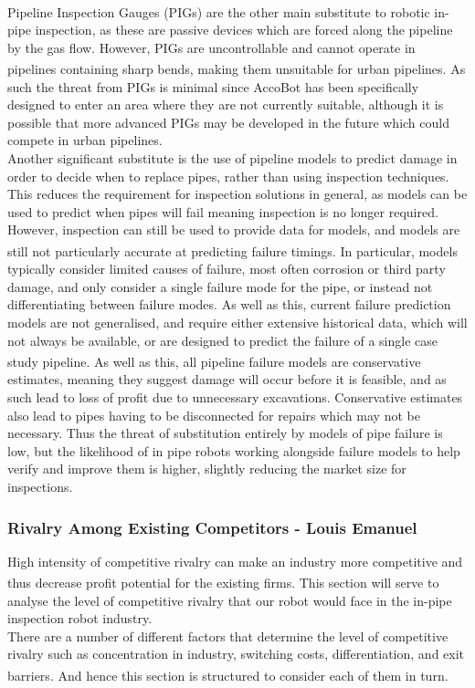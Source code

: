 \documentclass[11pt]{article}		%
\newcommand{\supercite}[1]{\textsuperscript{\cite{#1}}}		%
\begin{document}
				\\
				Pipeline Inspection Gauges (PIGs) are the other main substitute to robotic in-pipe inspection, as these are passive devices which are forced along the pipeline by the gas flow.
				However, PIGs are uncontrollable and cannot operate in pipelines containing sharp bends\supercite{mills2017advances}, making them unsuitable for urban pipelines.
				As such the threat from PIGs is minimal since AccoBot has been specifically designed to enter an area where they are not currently suitable, although it is possible that more advanced PIGs may be developed in the future which could compete in urban pipelines.
				\\
				Another significant substitute is the use of pipeline models to predict damage in order to decide when to replace pipes, rather than using inspection techniques.
				This reduces the requirement for inspection solutions in general, as models can be used to predict when pipes will fail meaning inspection is no longer required.
				However, inspection can still be used to provide data for models, and models are still not particularly accurate at predicting failure timings\supercite{zakikhani2020review}.
				In particular, models typically consider limited causes of failure, most often corrosion or third party damage, and only consider a single failure mode for the pipe, or instead not differentiating between failure modes.
				As well as this, current failure prediction models are not generalised, and require either extensive historical data, which will not always be available, or are designed to predict the failure of a single case study pipeline\supercite{zakikhani2020review}.
				As well as this, all pipeline failure models are conservative estimates, meaning they suggest damage will occur before it is feasible, and as such lead to loss of profit due to unnecessary excavations.
				Conservative estimates also lead to pipes having to be disconnected for repairs which may not be necessary.
				Thus the threat of substitution entirely by models of pipe failure is low, but the likelihood of in pipe robots working alongside failure models to help verify and improve them is higher, slightly reducing the market size for inspections.
			
			\subsubsection{Rivalry Among Existing Competitors - Louis Emanuel}
				High intensity of competitive rivalry can make an industry more competitive and thus decrease profit potential for the existing firms\supercite{porter2008five}. This section will serve to analyse the level of competitive rivalry that our robot would face in the in-pipe inspection robot industry. \\
		        \hspace*{3ex}There are a number of different factors that determine the level of competitive rivalry such as concentration in industry, switching costs, differentiation, and exit barriers\supercite{rivalryfactorsCI}. And hence this section is structured to consider each of them in turn. 
		        
\end{document}

